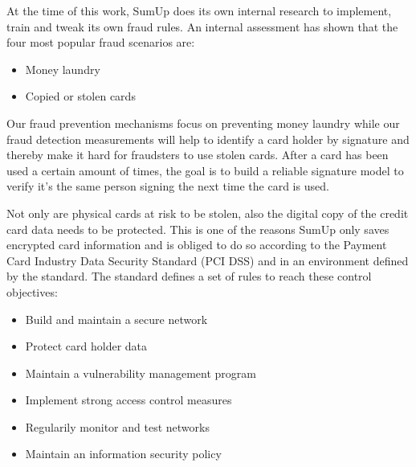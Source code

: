 \documentclass[a4paper, oneside]{csthesis}
\begin{document}
At the time of this work, SumUp does its own internal research to implement, train and tweak its own fraud rules. An internal assessment has shown that the four most popular fraud scenarios are:


\begin{itemize}
    \item Money laundry
    \item Copied or stolen cards
\end{itemize}

Our fraud prevention mechanisms focus on preventing money laundry while our fraud detection measurements will help to identify a card holder by signature and thereby make it hard for fraudsters to use stolen cards. After a card has been used a certain amount of times, the goal is to  build a reliable signature model to verify it's the same person signing the next time the card is used.

Not only are physical cards at risk to be stolen, also the digital copy of the credit card data needs to be protected. This is one of the reasons SumUp only saves encrypted card information and is obliged to do so according to the Payment Card Industry Data Security Standard (PCI DSS) and in an environment defined by the standard. The standard defines a set of rules to reach these control objectives:
\begin{itemize}
\item Build and maintain a secure network
\item Protect card holder data
\item Maintain a vulnerability management program
\item Implement strong access control measures
\item Regularily monitor and test networks
\item Maintain an information security policy
\end{itemize}
\end{document}
